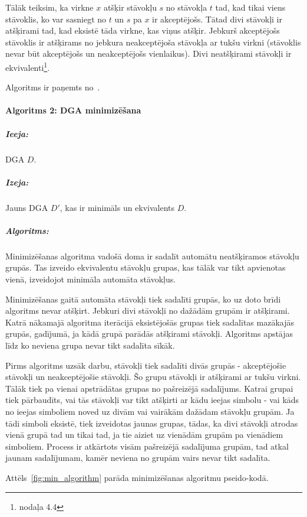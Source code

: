Tālāk teiksim, ka virkne $x$ atšķir stāvokļu $s$ no stāvokļa $t$ tad, kad tikai viens stāvoklis, ko var sasniegt no $t$ un $s$ pa $x$ ir akceptējošs. Tātad divi stāvokļi ir atšķirami tad, kad eksistē tāda virkne, kas viņus atšķir. Jebkurš akceptējošs stāvoklis ir atšķirams no jebkura neakceptējoša stāvokļa ar tukšu virkni (stāvoklis nevar būt akceptējošs un neakceptējošs vienlaikus). Divi neatšķirami stāvokļi ir ekvivalenti\footnote{\cite{Hopcroft:IntroAutomataTheory} nodaļa 4.4}.

Algoritms ir paņemts no~\cite{DragonBook}.

\paragraph*{Algoritms 2: DGA minimizēšana}
\subparagraph{Ieeja:}DGA $D$.
\subparagraph{Izeja:}Jauns DGA $D'$, kas ir minimāls un ekvivalents $D$.
\subparagraph{Algoritms:} 

Minimizēšanas algoritma vadošā doma ir sadalīt automātu neatšķiramos stāvokļu grupās. Tas izveido ekvivalentu stāvokļu grupas, kas tālāk var tikt apvienotas vienā, izveidojot minimāla automāta stāvokļus.

Minimizēšanas gaitā automāta stāvokļi tiek sadalīti grupās, ko uz doto brīdi algoritms nevar atšķirt. Jebkuri divi stāvokļi no dažādām grupām ir atšķirami. Katrā nākamajā algoritma iterācijā eksistējošās grupas tiek sadalītas mazākajās grupās, gadījumā, ja kādā grupā parādās atšķirami stāvokļi. Algoritms apstājas līdz ko neviena grupa nevar tikt sadalīta sīkāk.

Pirms algoritms uzsāk darbu, stāvokļi tiek sadalīti divās grupās - akceptējošie stāvokļi un neakceptējošie stāvokļi. Šo grupu stāvokļi ir atšķirami ar tukšu virkni. Tālāk tiek pa vienai apstrādātas grupas no pašreizējā sadalījums. Katrai grupai tiek pārbaudīts, vai tās stāvokļi var tikt atšķirti ar kādu ieejas simbolu - vai kāds no ieejas simboliem noved uz divām vai vairākām dažādam stāvokļu grupām. Ja tādi simboli eksistē, tiek izveidotas jaunas grupas, tādas, ka divi stāvokļi atrodas vienā grupā tad un tikai tad, ja tie aiziet uz vienādām grupām pa vienādiem simboliem. Process ir atkārtots visām pašreizējā sadalījuma grupām, tad atkal jaunam sadalījumam, kamēr neviena no grupām vairs nevar tikt sadalīta.

Attēls~\ref{fig:min_algorithm} parāda minimizēšanas algoritmu pseido-kodā.

